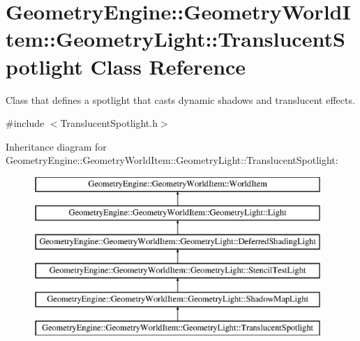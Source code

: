 \hypertarget{class_geometry_engine_1_1_geometry_world_item_1_1_geometry_light_1_1_translucent_spotlight}{}\section{Geometry\+Engine\+::Geometry\+World\+Item\+::Geometry\+Light\+::Translucent\+Spotlight Class Reference}
\label{class_geometry_engine_1_1_geometry_world_item_1_1_geometry_light_1_1_translucent_spotlight}


Class that defines a spotlight that casts dynamic shadows and translucent effects.  




{\ttfamily \#include $<$Translucent\+Spotlight.\+h$>$}

Inheritance diagram for Geometry\+Engine\+::Geometry\+World\+Item\+::Geometry\+Light\+::Translucent\+Spotlight\+:\begin{figure}[H]
\begin{center}
\leavevmode
\includegraphics[height=6.000000cm]{class_geometry_engine_1_1_geometry_world_item_1_1_geometry_light_1_1_translucent_spotlight}
\end{center}
\end{figure}
